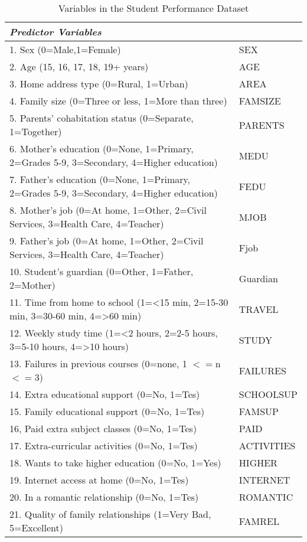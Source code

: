 \documentclass[sigconf]{acmart}
\begin{document}
\begin{table*}[ht]
  \caption{Variables in the Student Performance Dataset \cite{cortez08}}
  \label{tab:freq}
  \begin{tabular}{ll}
    \toprule
    \textit{Predictor Variables} &    \\
    \midrule
    1. Sex (0=Male,1=Female) & SEX  \\  
    2. Age (15, 16, 17, 18, 19+ years) & AGE  \\
    3. Home address type (0=Rural, 1=Urban) & AREA  \\
    4. Family size (0=Three or less, 1=More than three) & FAMSIZE  \\
    5. Parents' cohabitation status (0=Separate, 1=Together) & PARENTS  \\ 
    6. Mother's education (0=None, 1=Primary, 2=Grades 5-9,  3=Secondary, 4=Higher education) & MEDU  \\
    7. Father's education (0=None, 1=Primary, 2=Grades 5-9,  3=Secondary, 4=Higher education) & FEDU  \\
    8. Mother's job (0=At home, 1=Other, 2=Civil Services, 3=Health Care, 4=Teacher) & MJOB  \\
    9. Father's job (0=At home, 1=Other, 2=Civil Services, 3=Health Care, 4=Teacher) & Fjob  \\
    10. Student's guardian (0=Other, 1=Father, 2=Mother) & Guardian  \\
    11. Time from home to school (1=<15 min, 2=15-30 min, 3=30-60 min, 4=>60 min) & TRAVEL  \\
    12. Weekly study time (1=<2 hours, 2=2-5 hours, 3=5-10 hours, 4=>10 hours) & STUDY  \\
    13. Failures in previous courses (0=none, 1 $<=$n$<=$3) & FAILURES  \\
    14. Extra educational support (0=No, 1=Tes) & SCHOOLSUP  \\
    15. Family educational support (0=No, 1=Tes) & FAMSUP  \\
    16, Paid extra subject classes (0=No, 1=Tes) & PAID  \\
    17. Extra-curricular activities (0=No, 1=Tes) & ACTIVITIES  \\
    18. Wants to take higher education (0=No, 1=Yes) & HIGHER  \\
    19. Internet access at home (0=No, 1=Tes) & INTERNET  \\
    20. In a romantic relationship (0=No, 1=Tes) & ROMANTIC  \\
    21. Quality of family relationships (1=Very Bad, 5=Excellent) & FAMREL  \\

\end{tabular}
\end{table*}
\end{document}
